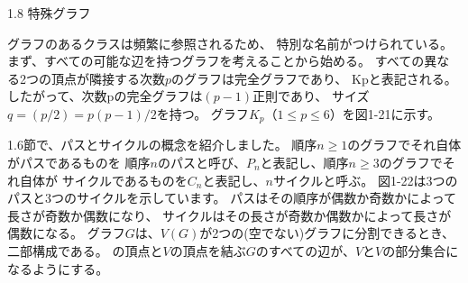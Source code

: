 
1.8 特殊グラフ

グラフのあるクラスは頻繁に参照されるため、
特別な名前がつけられている。
まず、すべての可能な辺を持つグラフを考えることから始める。
すべての異なる2つの頂点が隣接する次数$p$のグラフは完全グラフであり、
Kpと表記される。
したがって、次数pの完全グラフは$(p - 1)$正則であり、
サイズ$q = (p/2) = p(p - 1)/2 $を持つ。
グラフ$K_p（1\leq p \leq 6）$を図1-21に示す。

1.6節で、パスとサイクルの概念を紹介しました。
順序$n \geq 1$のグラフでそれ自体がパスであるものを
順序$n$のパスと呼び、$P_n$と表記し、順序$n \geq 3$のグラフでそれ自体が
サイクルであるものを$C_n$と表記し、$n$サイクルと呼ぶ。
図1-22は3つのパスと3つのサイクルを示しています。
パスはその順序が偶数か奇数かによって長さが奇数か偶数になり、
サイクルはその長さが奇数か偶数かによって長さが偶数になる。
グラフ$G$は、$V(G)$が2つの(空でない)グラフに分割できるとき、二部構成である。
の頂点と$V$の頂点を結ぶ$G$のすべての辺が、$V$と$V$の部分集合になるようにする。